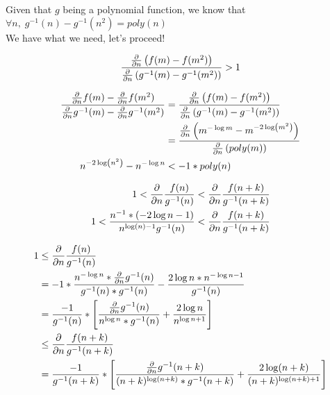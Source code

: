 \documentclass{article}
\begin{document}
	Given that $g$ being a polynomial function, we know that $\forall n,\; g^{-1}(n) - g^{-1}(n^2) = poly(n)$\\
	
	We have what we need, let's proceed!
	

$$ \frac{\pdv{}{n} \left( f(m) - f(m^2) \right)}{ \pdv{}{n} \left( g^{-1}(m) - g^{-1}(m^2) \right) } > 1$$

	\begin{equation}
	\begin{split}
	\frac{\pdv{}{n}f(m) - \pdv{}{n}f(m^2)}{\pdv{}{n}g^{-1}(m) - \pdv{}{n}g^{-1}(m^2)} & = \frac{\pdv{}{n} \left( f(m) - f(m^2) \right)}{ \pdv{}{n} \left( g^{-1}(m) - g^{-1}(m^2) \right) } \\
	& = \frac{\pdv{}{n} \left( m^{-\log m} - m^{-2\log(m^2)} \right)}{ \pdv{}{n} \left( poly(m) \right) } \\
	n^{-2\log(n^2)} - n^{-\log n}  & < -1 * poly(n)\\
	\end{split}
	\end{equation}

	\begin{equation}
	\begin{split}
	1 < \pdv{}{n} \frac{f(n)}{g^{-1}(n)} & < \pdv{}{n} \frac{f(n+k)}{g^{-1}(n+k)} \\
	1 < \frac{ n^{-1} * (-2 \log n - 1)}{n^{\log(n) - 1} g^{-1}(n)} & < \pdv{}{n} \frac{f(n+k)}{g^{-1}(n+k)} \\
	\end{split}
	\end{equation}

	\begin{equation}
	\begin{split}
	1 & \le	\pdv{}{n} \frac{f(n)}{g^{-1}(n)} \\
	  & =   -1 * \frac{n^{-\log n} * \pdv{}{n} g^{-1}(n)}{g^{-1}(n) * g^{-1}(n)} - \frac{2\log n * n^{-\log n - 1}}{g^{-1}(n)} \\
	  & = \frac{-1}{g^{-1}(n)} * \left[ \frac{\pdv{}{n} g^{-1}(n)}{n^{\log n} * g^{-1}(n)} + \frac{2\log n}{n^{\log n + 1}} \right] \\
	  & \le \pdv{}{n} \frac{f(n+k)}{g^{-1}(n+k)} \\
	  & = \frac{-1}{g^{-1}(n+k)} * \left[ \frac{\pdv{}{n} g^{-1}(n+k)}{(n+k)^{\log(n+k)} * g^{-1}(n+k)} + \frac{2\log(n+k)}{(n+k)^{\log(n+k) + 1}} \right]
	\end{split}
	\end{equation}
\end{document}
